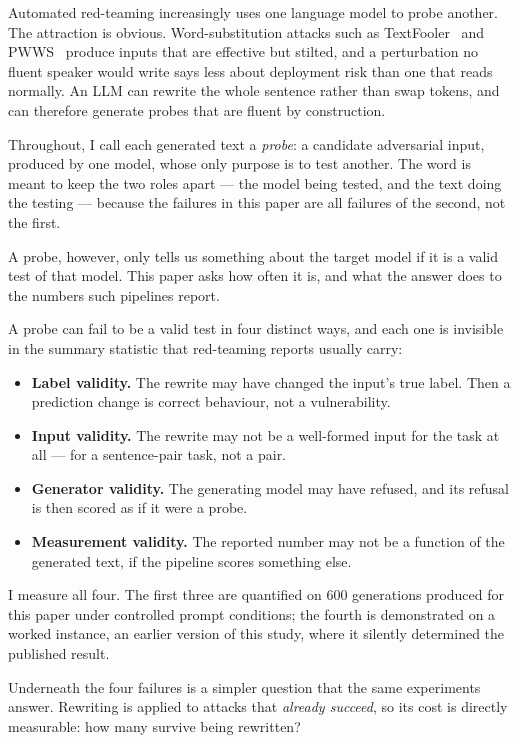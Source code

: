 \documentclass[11pt]{article}
\begin{document}
Automated red-teaming increasingly uses one language model to probe another. The
attraction is obvious. Word-substitution attacks such as
TextFooler~\citep{jin2020bert} and PWWS~\citep{ren2019pwws} produce inputs that
are effective but stilted, and a perturbation no fluent speaker would write says
less about deployment risk than one that reads normally. An LLM can rewrite the
whole sentence rather than swap tokens, and can therefore generate probes that
are fluent by construction.

Throughout, I call each generated text a \emph{probe}: a candidate adversarial
input, produced by one model, whose only purpose is to test another. The word is
meant to keep the two roles apart --- the model being tested, and the text doing
the testing --- because the failures in this paper are all failures of the
second, not the first.

A probe, however, only tells us something about the target model if it is a valid
test of that model. This paper asks how often it is, and what the answer does to
the numbers such pipelines report.

A probe can fail to be a valid test in four distinct ways, and each one is
invisible in the summary statistic that red-teaming reports usually carry:

\begin{itemize}
\item \textbf{Label validity.} The rewrite may have changed the input's true
      label. Then a prediction change is correct behaviour, not a vulnerability.
\item \textbf{Input validity.} The rewrite may not be a well-formed input for
      the task at all --- for a sentence-pair task, not a pair.
\item \textbf{Generator validity.} The generating model may have refused, and
      its refusal is then scored as if it were a probe.
\item \textbf{Measurement validity.} The reported number may not be a function
      of the generated text, if the pipeline scores something else.
\end{itemize}

I measure all four. The first three are quantified on 600 generations produced for
this paper under controlled prompt conditions; the fourth is demonstrated on a
worked instance, an earlier version of this study, where it silently determined
the published result.

Underneath the four failures is a simpler question that the same experiments
answer. Rewriting is applied to attacks that \emph{already succeed}, so its cost
is directly measurable: how many survive being rewritten?
\end{document}
